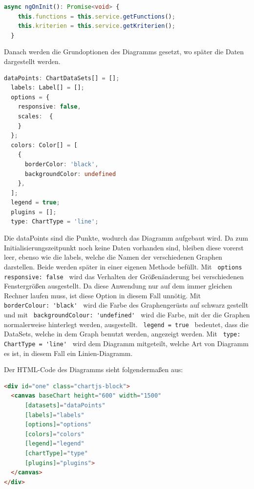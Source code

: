 \begin{lstlisting}[language=Typescript, caption={Initialisierung der Komponente}]
  async ngOnInit(): Promise<void> {
    this.functions = this.service.getFunctions();
    this.kriterien = this.service.getKriterien();
  }
\end{lstlisting}

Danach werden die Grundoptionen des Diagramms gesetzt, wo später die Daten dargestellt werden.

\begin{lstlisting}[language=Typescript, caption={Grundoptionen des Diagramms}]
  dataPoints: ChartDataSets[] = [];
  labels: Label[] = [];
  options = {
    responsive: false,
    scales:  {
    }
  };
  colors: Color[] = [
    {
      borderColor: 'black',
      backgroundColor: undefined
    },
  ];
  legend = true;
  plugins = [];
  type: ChartType = 'line';
\end{lstlisting}

Die dataPoints sind die Punkte, wodurch das Diagramm aufgebaut wird. Da zum Initialisierungszeitpunkt noch keine Daten vorhanden sind,
bleiben diese vorerst leer, ebenso wie die labels, welche die Namen der verschiedenen Graphen darstellen. Beide werden später in einer
eigenen Methode befüllt. Mit \lstinline | options responsive: false | wird das Verhalten der Größenänderung bei verschiedenen
Fenstergrößen ausgestellt. Da diese Anwendung nur auf dem immer gleichen Rechner laufen muss, ist diese Option in diesem Fall unnötig.
Mit \lstinline | borderColour: 'black' | wird die Farbe des Graphengerüsts auf schwarz gestellt und mit \lstinline | backgroundColour: 'undefined' | 
wird die Farbe, mit der die Graphen normalerweise hinterlegt werden, ausgestellt. \lstinline | legend = true | bedeutet,
dass die DataSets, welche in dem Graph benutzt werden, angezeigt werden. Mit \lstinline | type: ChartType = 'line' | wird dem 
Diagramm mitgeteilt, welche Art von Diagramm es ist, in diesem Fall ein Linien-Diagramm.

Der HTML-Code des Diagramms sieht folgendermaßen aus:

\begin{lstlisting}[language=HTML, caption={HTML für das Diagramm}]
<div id="one" class="chartjs-block">
  <canvas baseChart height="600" width="1500"
      [datasets]="dataPoints"
      [labels]="labels"
      [options]="options"
      [colors]="colors"
      [legend]="legend"
      [chartType]="type"
      [plugins]="plugins">
  </canvas>
</div>
\end{lstlisting}

